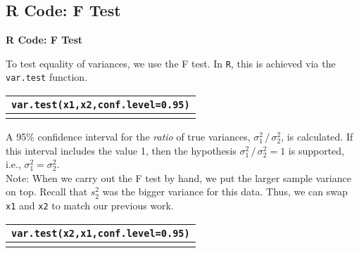 \documentclass[compress]{beamer}        %
\makeatletter
\newcommand{\tcb}{\textcolor{beamer@blendedblue}}
\makeatother
\begin{document}
\subsection{R Code: F Test}
\begin{frame}{\bf \tcb{R Code: F Test}}

To test equality of variances, we use the F test. In \texttt{R}, this is achieved via the \texttt{var.test} function.\\[0.2cm]

\begin{tabular}{|l|}
\hline
\texttt{var.test(x1,x2,conf.level=0.95)}\\
\hline
\multicolumn{1}{c}{}\\[-0.2cm]
\end{tabular}

A 95\% confidence interval for the \emph{ratio} of true variances, $\sigma_1^2 \, / \, \sigma_2^2$, is calculated. If this interval includes the value 1, then the hypothesis $\sigma_1^2 \, / \, \sigma_2^2=1$ is supported, i.e., $\sigma_1^2 = \sigma_2^2$.\\[0.8cm]

Note: When we carry out the F test by hand, we put the larger sample variance on top. Recall that $s_2^2$ was the bigger variance for this data. Thus, we can swap \texttt{x1} and \texttt{x2} to match our previous work.\\[0.2cm]

\begin{tabular}{|l|}
\hline
\texttt{var.test(x2,x1,conf.level=0.95)}\\
\hline
\multicolumn{1}{c}{}\\[0.2cm]
\end{tabular}

\end{frame}
\end{document}
